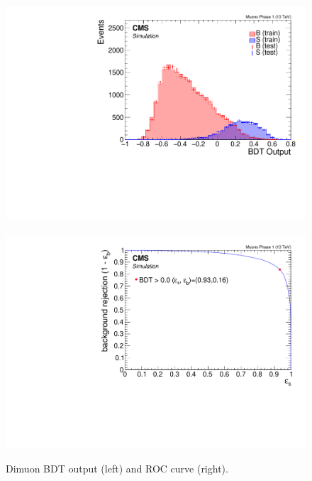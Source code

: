 \begin{figure}[!htb]
\centering
\includegraphics[width=0.48\linewidth]{plots/dimuon_bdt/overtraining_Event_Dilepton_Muons_Phase_1.pdf} \,
\includegraphics[width=0.48\linewidth]{plots/dimuon_bdt/roc_Event_Dilepton_Muons_Phase_1.pdf} \\


\caption[Dimuon BDT output and ROC curve]{Dimuon BDT output (left) and ROC curve (right).}
\label{fig:event-bdt-dimuon-output}
\end{figure}


